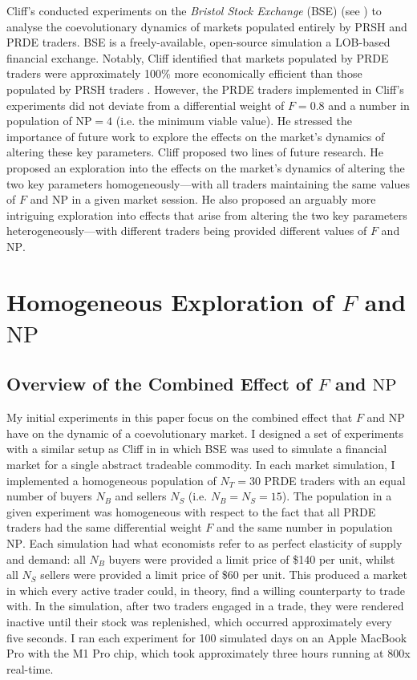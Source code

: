 \documentclass[conference]{IEEEtran}
\begin{document}
Cliff's conducted experiments on the \textit{Bristol Stock Exchange} (BSE) (see \cite{BSE, BSEPaper}) to analyse the coevolutionary dynamics of markets populated entirely by PRSH and PRDE traders.
BSE is a freely-available, open-source simulation a LOB-based financial exchange.
Notably, Cliff identified that markets populated by PRDE traders were approximately 100\% more economically efficient than those populated by PRSH traders \cite{PRDE}.
However, the PRDE traders implemented in Cliff's experiments did not deviate from a differential weight of $F=0.8$ and a number in population of $\mathrm{NP}=4$ (i.e. the minimum viable value).
He stressed the importance of future work to explore the effects on the market's dynamics of altering these key parameters.
Cliff proposed two lines of future research.
He proposed an exploration into the effects on the market's dynamics of altering the two key parameters homogeneously---with all traders maintaining the same values of $F$ and $\mathrm{NP}$ in a given market session.
He also proposed an arguably more intriguing exploration into effects that arise from altering the two key parameters heterogeneously---with different traders being provided different values of $F$ and $\mathrm{NP}$.

\section{Homogeneous Exploration of $F$ and $\mathrm{NP}$}

\subsection{Overview of the Combined Effect of $F$ and $\mathrm{NP}$}

My initial experiments in this paper focus on the combined effect that $F$ and $\mathrm{NP}$ have on the dynamic of a coevolutionary market.
I designed a set of experiments with a similar setup as Cliff in \cite{PRDE} in which BSE was used to simulate a financial market for a single abstract tradeable commodity.
In each market simulation, I implemented a homogeneous population of $N_T=30$ PRDE traders with an equal number of buyers $N_B$ and sellers $N_S$ (i.e. $N_B=N_S=15$).
The population in a given experiment was homogeneous with respect to the fact that all PRDE traders had the same differential weight $F$ and the same number in population $\mathrm{NP}$.
Each simulation had what economists refer to as perfect elasticity of supply and demand: all $N_B$ buyers were provided a limit price of \$140 per unit, whilst all $N_S$ sellers were provided a limit price of \$60 per unit.
This produced a market in which every active trader could, in theory, find a willing counterparty to trade with.
In the simulation, after two traders engaged in a trade, they were rendered inactive until their stock was replenished, which occurred approximately every five seconds.
I ran each experiment for 100 simulated days on an Apple MacBook Pro with the M1 Pro chip, which took approximately three hours running at 800x real-time.
\end{document}

